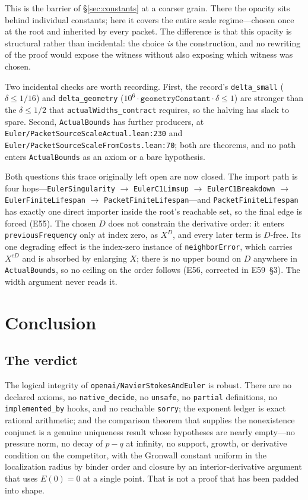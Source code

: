 \documentclass[11pt]{article}
\newcommand{\ct}[1]{\texttt{#1}}
\newcommand{\file}[1]{\texttt{\small #1}}
\theoremstyle{plain}
\theoremstyle{definition}
\theoremstyle{remark}
\begin{document}
This is the barrier of \S\ref{sec:constants} at a coarser grain. There the
opacity sits behind individual constants; here it covers the entire scale
regime---chosen once at the root and inherited by every packet. The difference
is that this opacity is structural rather than incidental: the choice
\emph{is} the construction, and no rewriting of the proof would expose the
witness without also exposing which witness was chosen.

Two incidental checks are worth recording. First, the record's
\ct{delta\_small} ($\delta\le 1/16$) and \ct{delta\_geometry}
($10^{6}\cdot\ct{geometryConstant}\cdot\delta\le 1$) are stronger than the
$\delta\le 1/2$ that \ct{actualWidths\_contract} requires, so the halving has
slack to spare. Second, \ct{ActualBounds} has further producers, at
\file{Euler/PacketSourceScaleActual.lean:230} and
\file{Euler/PacketSourceScaleFromCosts.lean:70}; both are theorems, and no path
enters \ct{ActualBounds} as an axiom or a bare hypothesis.

Both questions this trace originally left open are now closed. The import path
is four hops---\file{EulerSingularity} $\to$ \file{EulerC1Limsup} $\to$
\file{EulerC1Breakdown} $\to$ \file{EulerFiniteLifespan} $\to$
\file{PacketFiniteLifespan}---and \ct{PacketFiniteLifespan} has exactly one
direct importer inside the root's reachable set, so the final edge is forced
(E55). The chosen $D$ does not constrain the derivative order: it enters
\ct{previousFrequency} only at index zero, as $X^{D}$, and every later term is
$D$-free. Its one degrading effect is the index-zero instance of
\ct{neighborError}, which carries $X^{cD}$ and is absorbed by enlarging $X$;
there is no upper bound on $D$ anywhere in \ct{ActualBounds}, so no ceiling on
the order follows (E56, corrected in E59~\S3). The width argument never reads
it.

\section{Conclusion}
\label{sec:conclusion}

\subsection{The verdict}

The logical integrity of \texttt{openai/NavierStokesAndEuler} is robust. There
are no declared axioms, no \ct{native\_decide}, no \ct{unsafe}, no \ct{partial}
definitions, no \ct{implemented\_by} hooks, and no reachable \ct{sorry}; the
exponent ledger is exact rational arithmetic; and the comparison theorem that
supplies the nonexistence conjunct is a genuine uniqueness result whose
hypotheses are nearly empty---no pressure norm, no decay of $p-q$ at infinity, no
support, growth, or derivative condition on the competitor, with the Gronwall
constant uniform in the localization radius by binder order and closure by an
interior-derivative argument that uses $E(0)=0$ at a single point. That is not a
proof that has been padded into shape.
\end{document}
